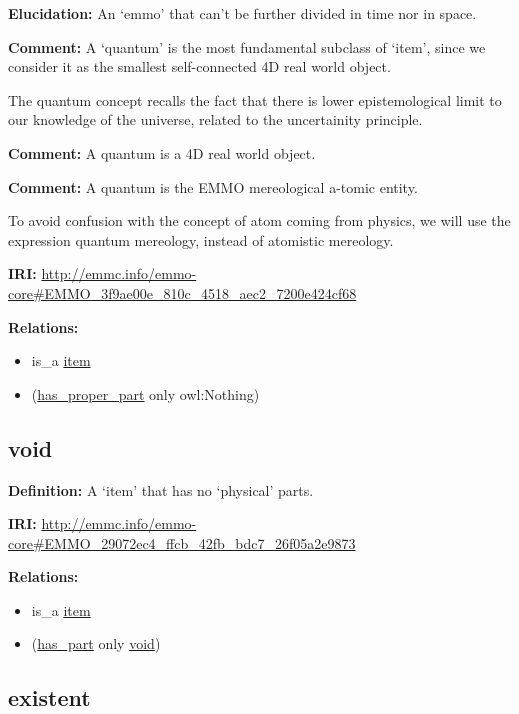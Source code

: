 \documentclass[a4paper,]{report}
\providecommand{\tightlist}{%
  \setlength{\itemsep}{0pt}\setlength{\parskip}{0pt}}
\begin{document}
\textbf{Elucidation:} An `emmo' that can't be further divided in time
nor in space.

\textbf{Comment:} A `quantum' is the most fundamental subclass of
`item', since we consider it as the smallest self-connected 4D real
world object.

The quantum concept recalls the fact that there is lower epistemological
limit to our knowledge of the universe, related to the uncertainity
principle.

\textbf{Comment:} A quantum is a 4D real world object.

\textbf{Comment:} A quantum is the EMMO mereological a-tomic entity.

To avoid confusion with the concept of atom coming from physics, we will
use the expression quantum mereology, instead of atomistic mereology.

\textbf{IRI:}
\url{http://emmc.info/emmo-core\#EMMO_3f9ae00e_810c_4518_aec2_7200e424cf68}

\textbf{Relations:}

\begin{itemize}
\tightlist
\item
  is\_a \protect\hyperlink{item}{item}
\item
  (\protect\hyperlink{has_proper_part}{has\_proper\_part} only
  owl:Nothing)
\end{itemize}

\hypertarget{void}{%
\subsection{void}\label{void}}

\textbf{Definition:} A `item' that has no `physical' parts.

\textbf{IRI:}
\url{http://emmc.info/emmo-core\#EMMO_29072ec4_ffcb_42fb_bdc7_26f05a2e9873}

\textbf{Relations:}

\begin{itemize}
\tightlist
\item
  is\_a \protect\hyperlink{item}{item}
\item
  (\protect\hyperlink{has_part}{has\_part} only
  \protect\hyperlink{void}{void})
\end{itemize}

\hypertarget{existent}{%
\subsection{existent}\label{existent}}
\end{document}
